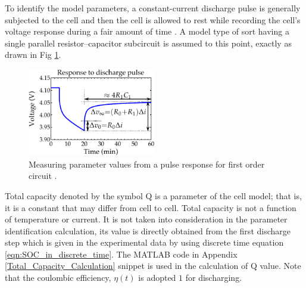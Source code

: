 \documentclass[12pt]{article}
\begin{document}
To identify the model parameters, a constant-current discharge pulse
is  generally subjected to the cell and then the cell is allowed
to rest while recording the cell’s voltage response during a fair amount of time \cite{Plett2015}. A model type of sort having a single parallel resistor–capacitor subcircuit is assumed to this point, exactly as drawn in Fig \ref{fig:Response_to_discharge_pulse}. \newline 

\begin{figure}[t!]
	\centering
	\includegraphics[width=0.5\textwidth, keepaspectratio]{images/Parameter_values_from_a_pulse_response.pdf}
	\caption{ Measuring parameter values
from a pulse response for first order circuit \cite{Plett2015}.}
	\label{fig:Response_to_discharge_pulse}
\end{figure}

\par \noindent Total capacity denoted by the symbol Q is a parameter of the cell model; that is, it is
a constant that may differ from cell to cell. Total capacity is not a
function of temperature or current. It is not taken into consideration in the parameter identification calculation, its value is directly obtained from the first discharge step which is given in the experimental data by using discrete time equation \ref{eqn:SOC_in_discrete_time}. The MATLAB code in Appendix \ref{Total_Capacity_Calculation} snippet is used in the calculation of Q value. Note that the coulombic efficiency, $\eta(t)$ is adopted $1$ for discharging. \newline      
\end{document}
